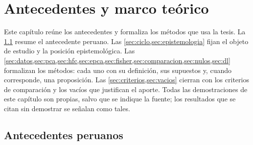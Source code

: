 \chapter{Antecedentes y marco teórico}
\label{cap:marco}

Este capítulo reúne los antecedentes y formaliza los métodos que usa la tesis. La
\cref{sec:antecedentes} resume el antecedente peruano. Las
\cref{sec:ciclo,sec:epistemologia} fijan el objeto de estudio y la posición epistemológica. Las
\cref{sec:datos,sec:pca,sec:hfc,sec:epca,sec:fisher,sec:comparacion,sec:nulos,sec:dl} formalizan
los métodos: cada uno con su definición, sus supuestos y, cuando corresponde, una proposición. Las
\cref{sec:criterios,sec:vacios} cierran con los criterios de comparación y los vacíos que
justifican el aporte. Todas las demostraciones de este capítulo son propias, salvo que se indique
la fuente; los resultados que se citan sin demostrar se señalan como tales.

\section{Antecedentes peruanos}
\label{sec:antecedentes}

